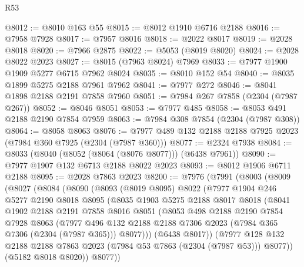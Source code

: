 \begin{lexlean}{R53}
\begin{coremodule}
@8012 := @8010 @163 @55
@8015 := @8012 @1910 @6716 @2188
@8016 := @7958 @7928
@8017 := @7957 @8016
@8018 := @2022 @8017
@8019 := @2028 @8018
@8020 := @7966 @2875
@8022 := @5053 (@8019 @8020)
@8024 := @2028 @8022 @2023
@8027 := @8015 (@7963 @8024) @7969
@8033 := @7977 @1900 @1909 @5277 @6715 @7962 @8024
@8035 := @8010 @152 @54
@8040 := @8035 @1899 @5275 @2188 @7961 @7962
@8041 := @7977 @272
@8046 := @8041 @1898 @2188 @2191 @7858 @7960
@8051 := @7984 @267 @7858 (@2304 (@7987 @267))
@8052 := @8046 @8051
@8053 := @7977 @485
@8058 := @8053 @491 @2188 @2190 @7854 @7959
@8063 := @7984 @308 @7854 (@2304 (@7987 @308))
@8064 := @8058 @8063
@8076 := @7977 @489 @132 @2188 @2188 @7925 @2023 (@7984 @360 @7925 (@2304 (@7987 @360)))
@8077 := @2324 @7938
@8084 := @8033 (@8040 (@8052 (@8064 (@8076 @8077))) (@6438 @7961))
@8090 := @7977 @1907 @132 @6713 @2188 @8022 @2023
@8093 := @8012 @1906 @6711 @2188
@8095 := @2028 @7863 @2023
@8200 := @7976
    (@7991
      (@8003
        (@8009
          (@8027
            (@8084
              (@8090
                (@8093
                  (@8019 @8095)
                  @8022
                  (@7977
                    @1904
                    @246
                    @5277
                    @2190
                    @8018
                    @8095
                    (@8035
                      @1903
                      @5275
                      @2188
                      @8017
                      @8018
                      (@8041
                        @1902
                        @2188
                        @2191
                        @7858
                        @8016
                        @8051
                        (@8053
                          @498
                          @2188
                          @2190
                          @7854
                          @7928
                          @8063
                          (@7977
                            @496
                            @132
                            @2188
                            @2188
                            @7306
                            @2023
                            (@7984 @365 @7306 (@2304 (@7987 @365)))
                            @8077)))
                      (@6438 @8017))
                    (@7977
                      @128
                      @132
                      @2188
                      @2188
                      @7863
                      @2023
                      (@7984 @53 @7863 (@2304 (@7987 @53)))
                      @8077))
                  (@5182 @8018 @8020))
                @8077))

\end{coremodule}
\end{lexlean}
